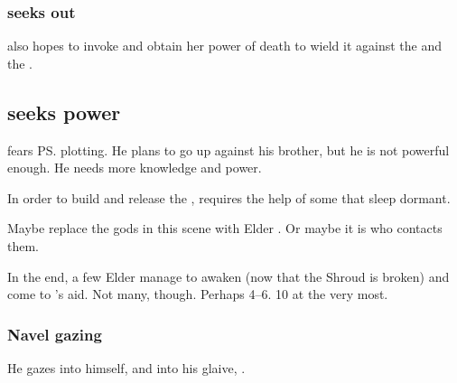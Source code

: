 \subsubsection{\Secherdamon{} seeks out \KhothSell}
\Secherdamon{} also hopes to invoke \KhothSell{} and obtain her power of death to wield it against the \sephiroth{} and the \Morbus. 








\subsection{\Ishnaruchaefir{} seeks power}
\Ishnaruchaefir{} fears \ps{\Secherdamon} plotting. 
He plans to go up against his brother, but he is not powerful enough. 
He needs more knowledge and power. 

In order to build and release the , \Ishnaruchaefir requires the help of some  that sleep dormant.

Maybe replace the gods in this scene with Elder \Dragons. 
Or maybe it is \Secherdamon who contacts them.

In the end, a few Elder \Dragons manage to awaken (now that the Shroud is broken) and come to \Ishnaruchaefir's aid.
Not many, though. 
Perhaps 4--6.
10 at the very most. 




\subsubsection{Navel gazing}
He gazes into himself, and into his glaive, \Triestessakhin. 






